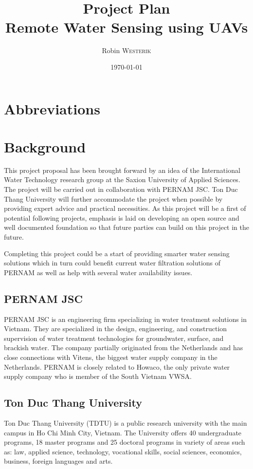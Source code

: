 \documentclass[11pt, a4paper]{article}
\title{Project Plan\\Remote Water Sensing using UAVs}
\author{Robin \textsc{Westerik}}
\date{\today}
\begin{document}



\tableofcontents
\pagebreak
\section{Abbreviations}
\printnomenclature

\pagebreak

\section{Background}
This project proposal has been brought forward by an idea of the International Water Technology research group at the Saxion University of Applied Sciences. The project will be carried out in collaboration with PERNAM JSC. Ton Duc Thang University will further accommodate the project when possible by providing expert advice and practical necessities. As this project will be a first of potential following projects, emphasis is laid on developing an open source and well documented foundation so that future parties can build on this project in the future. 

Completing this project could be a start of providing smarter water sensing solutions which in turn could benefit current water filtration solutions of PERNAM as well as help with several water availability issues.

\subsection{PERNAM JSC}
PERNAM JSC \cite{pernam} is an engineering firm specializing in water treatment solutions in Vietnam. They are specialized in the design, engineering, and construction supervision of water treatment technologies for groundwater, surface, and brackish water. The company partially originated from the Netherlands and has close connections with Vitens, the biggest water supply company in the Netherlands. PERNAM is closely related to Howaco, the only private water supply company who is member of the South Vietnam VWSA.

\subsection{Ton Duc Thang University}
Ton Duc Thang University (TDTU) \cite{tdtu} is a public research university with the main campus in Ho Chi Minh City, Vietnam. The University offers 40 undergraduate programs, 18 master programs and 25 doctoral programs in variety of areas such as: law, applied science, technology, vocational skills, social sciences, economics, business, foreign languages and arts. 
\end{document}
